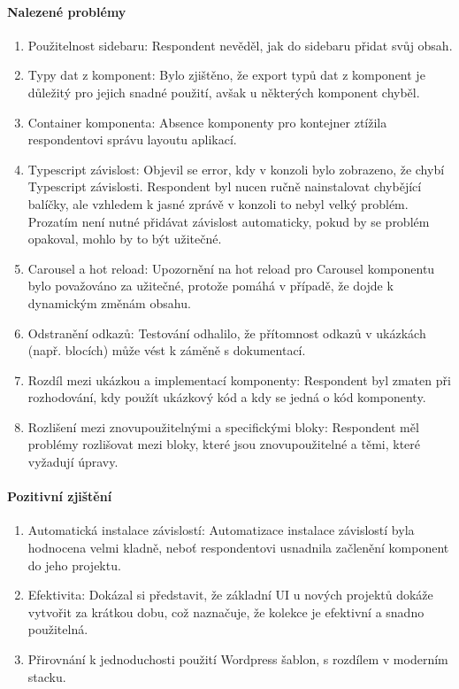 \paragraph{Nalezené problémy}
\begin{enumerate}
  \item Použitelnost sidebaru: Respondent nevěděl, jak do sidebaru přidat svůj obsah.
  \item Typy dat z komponent: Bylo zjištěno, že export typů dat z komponent je důležitý pro jejich snadné použití, avšak u některých komponent chyběl.
  \item Container komponenta: Absence komponenty pro kontejner ztížila respondentovi správu layoutu aplikací.
  \item Typescript závislost: Objevil se error, kdy v konzoli bylo zobrazeno, že chybí Typescript závislosti. Respondent byl nucen ručně nainstalovat chybějící balíčky, ale vzhledem k jasné zprávě v konzoli to nebyl velký problém. Prozatím není nutné přidávat závislost automaticky, pokud by se problém opakoval, mohlo by to být užitečné.
  \item Carousel a hot reload: Upozornění na hot reload pro Carousel komponentu bylo považováno za užitečné, protože pomáhá v případě, že dojde k dynamickým změnám obsahu.
  \item Odstranění odkazů: Testování odhalilo, že přítomnost odkazů v ukázkách (např. blocích) může vést k záměně s dokumentací.
  \item Rozdíl mezi ukázkou a implementací komponenty: Respondent byl zmaten při rozhodování, kdy použít ukázkový kód a kdy se jedná o kód komponenty.
  \item Rozlišení mezi znovupoužitelnými a specifickými bloky: Respondent měl problémy rozlišovat mezi bloky, které jsou znovupoužitelné a těmi, které vyžadují úpravy.
\end{enumerate}

\paragraph{Pozitivní zjištění}
\begin{enumerate}
  \item Automatická instalace závislostí: Automatizace instalace závislostí byla hodnocena velmi kladně, neboť respondentovi usnadnila začlenění komponent do jeho projektu.
  \item Efektivita: Dokázal si představit, že základní UI u nových projektů dokáže vytvořit za krátkou dobu, což naznačuje, že kolekce je efektivní a snadno použitelná.
  \item Přirovnání k jednoduchosti použití Wordpress šablon, s rozdílem v moderním stacku.
\end{enumerate}

